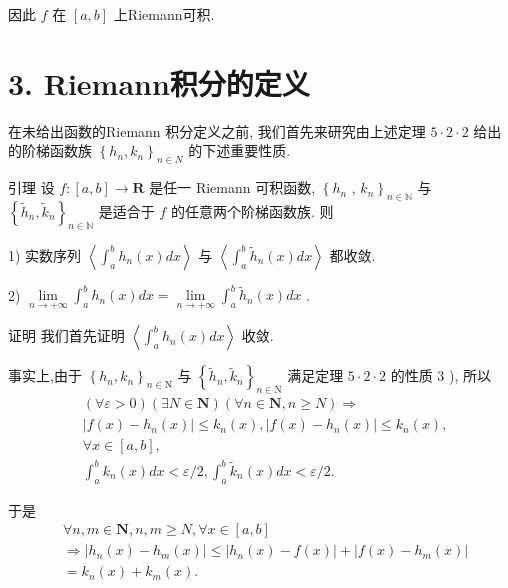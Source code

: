 因此 $f$ 在 $\left\lbrack  {a,b}\right\rbrack$ 上Riemann可积.

\section*{3. Riemann积分的定义}

在未给出函数的Riemann 积分定义之前, 我们首先来研究由上述定理 $5 \cdot  2 \cdot  2$ 给出的阶梯函数族 ${\left\{  {h}_{n},{k}_{n}\right\}  }_{n \in  N}$ 的下述重要性质.

引理 设 $f : \left\lbrack  {a,b}\right\rbrack   \rightarrow  \mathbf{R}$ 是任一 Riemann 可积函数, $\left\{  {h}_{n}\right.$ , ${\left. {k}_{n}\right\}  }_{n \in  \mathbb{N}}$ 与 ${\left\{  {\widetilde{h}}_{n},{\widetilde{k}}_{n}\right\}  }_{n \in  \mathbb{N}}$ 是适合于 $f$ 的任意两个阶梯函数族. 则

1) 实数序列 $\left\langle  {{\int }_{a}^{b}{h}_{n}\left( x\right) {dx}}\right\rangle$ 与 $\left\langle  {{\int }_{a}^{b}{\widetilde{h}}_{n}\left( x\right) {dx}}\right\rangle$ 都收敛.

2) $\mathop{\lim }\limits_{{n \rightarrow   + \infty }}{\int }_{a}^{b}{h}_{n}\left( x\right) {dx} = \mathop{\lim }\limits_{{n \rightarrow   + \infty }}{\int }_{a}^{b}{\widetilde{h}}_{n}\left( x\right) {dx}$ .

证明 我们首先证明 $\left\langle  {{\int }_{a}^{b}{h}_{n}\left( x\right) {dx}}\right\rangle$ 收敛.

事实上,由于 ${\left\{  {h}_{n},{k}_{n}\right\}  }_{n \in  \mathrm{N}}$ 与 ${\left\{  {\widetilde{h}}_{n},{\widetilde{k}}_{n}\right\}  }_{n \in  \mathrm{N}}$ 满足定理 $5 \cdot  2 \cdot  2$ 的性质 3 ), 所以
\begin{align*}
	&\left( {\forall \varepsilon  > 0}\right) \left( {\exists N \in  \mathbf{N}}\right) \left( {\forall n \in  \mathbf{N},n \geq  N}\right)  \Rightarrow\\
	&\left| {f\left( x\right)  - {h}_{n}\left( x\right) }\right|  \leq  {k}_{n}\left( x\right) ,\left| {f\left( x\right)  - {h}_{n}\left( x\right) }\right|  \leq  {k}_{n}\left( x\right) ,\\
	&\forall x \in  \left\lbrack  {a,b}\right\rbrack  ,\\
	&{\int }_{a}^{b}{k}_{n}\left( x\right) {dx} < \varepsilon /2,{\int }_{a}^{b}{\widetilde{k}}_{n}\left( x\right) {dx} < \varepsilon /2.
\end{align*}

于是
\begin{align*}
	&\forall n,m \in  \mathbf{N},n,m \geq  N,\forall x \in  \left\lbrack  {a,b}\right\rbrack\\
	&\Rightarrow  \left| {{h}_{n}\left( x\right)  - {h}_{m}\left( x\right) }\right|  \leq  \left| {{h}_{n}\left( x\right)  - f\left( x\right) }\right|  + \left| {f\left( x\right)  - {h}_{m}\left( x\right) }\right|\\
	&= {k}_{n}\left( x\right)  + {k}_{m}\left( x\right) .
\end{align*}

